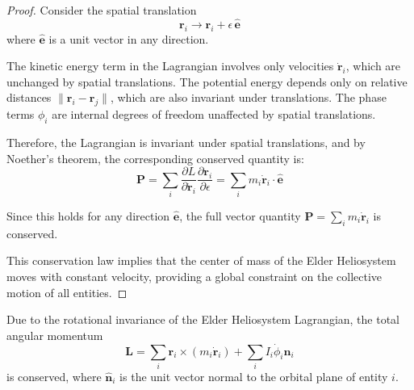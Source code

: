 \begin{proof}
Consider the spatial translation 
\begin{equation}
\mathbf{r}_i \to \mathbf{r}_i + \epsilon \, \hat{\mathbf{e}}
\end{equation}
where $\hat{\mathbf{e}}$ is a unit vector in any direction.

The kinetic energy term in the Lagrangian involves only velocities $\dot{\mathbf{r}}_i$, which are unchanged by spatial translations. The potential energy depends only on relative distances $\|\mathbf{r}_i - \mathbf{r}_j\|$, which are also invariant under translations. The phase terms $\phi_i$ are internal degrees of freedom unaffected by spatial translations.

Therefore, the Lagrangian is invariant under spatial translations, and by Noether's theorem, the corresponding conserved quantity is:
\begin{equation}
\mathbf{P} = \sum_i \frac{\partial L}{\partial \dot{\mathbf{r}}_i} \frac{\partial \mathbf{r}_i}{\partial \epsilon} = \sum_i m_i \dot{\mathbf{r}}_i \cdot \hat{\mathbf{e}}
\end{equation}

Since this holds for any direction $\hat{\mathbf{e}}$, the full vector quantity $\mathbf{P} = \sum_i m_i \dot{\mathbf{r}}_i$ is conserved.

This conservation law implies that the center of mass of the Elder Heliosystem moves with constant velocity, providing a global constraint on the collective motion of all entities.
\end{proof}

\begin{theorem}
Due to the rotational invariance of the Elder Heliosystem Lagrangian, the total angular momentum
\begin{equation}
\mathbf{L} = \sum_i \mathbf{r}_i \times (m_i \dot{\mathbf{r}}_i) + \sum_i I_i\dot{\phi}_i \hat{\mathbf{n}}_i
\end{equation}
is conserved, where $\hat{\mathbf{n}}_i$ is the unit vector normal to the orbital plane of entity $i$.
\end{theorem}

